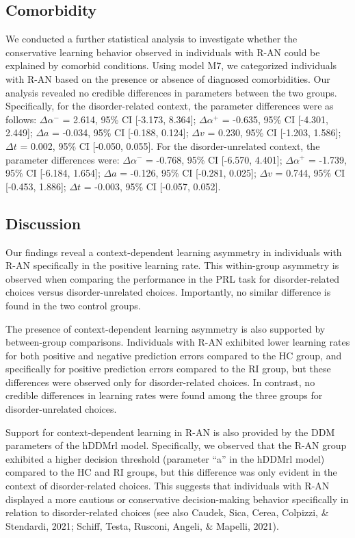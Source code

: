 \documentclass[
  man,floatsintext]{apa6}
\begin{document}
\hypertarget{comorbidity}{%
\subsection{Comorbidity}\label{comorbidity}}

We conducted a further statistical analysis to investigate whether the conservative learning behavior observed in individuals with R-AN could be explained by comorbid conditions. Using model M7, we categorized individuals with R-AN based on the presence or absence of diagnosed comorbidities. Our analysis revealed no credible differences in parameters between the two groups. Specifically, for the disorder-related context, the parameter differences were as follows: \(\Delta \alpha^-\) = 2.614, 95\% CI {[}-3.173, 8.364{]}; \(\Delta \alpha^+\) = -0.635, 95\% CI {[}-4.301, 2.449{]}; \(\Delta a\) = -0.034, 95\% CI {[}-0.188, 0.124{]}; \(\Delta v\) = 0.230, 95\% CI {[}-1.203, 1.586{]}; \(\Delta t\) = 0.002, 95\% CI {[}-0.050, 0.055{]}. For the disorder-unrelated context, the parameter differences were: \(\Delta \alpha^-\) = -0.768, 95\% CI {[}-6.570, 4.401{]}; \(\Delta \alpha^+\) = -1.739, 95\% CI {[}-6.184, 1.654{]}; \(\Delta a\) = -0.126, 95\% CI {[}-0.281, 0.025{]}; \(\Delta v\) = 0.744, 95\% CI {[}-0.453, 1.886{]}; \(\Delta t\) = -0.003, 95\% CI {[}-0.057, 0.052{]}.

\hypertarget{discussion}{%
\subsection{Discussion}\label{discussion}}

Our findings reveal a context-dependent learning asymmetry in individuals with R-AN specifically in the positive learning rate. This within-group asymmetry is observed when comparing the performance in the PRL task for disorder-related choices versus disorder-unrelated choices. Importantly, no similar difference is found in the two control groups.

The presence of context-dependent learning asymmetry is also supported by between-group comparisons. Individuals with R-AN exhibited lower learning rates for both positive and negative prediction errors compared to the HC group, and specifically for positive prediction errors compared to the RI group, but these differences were observed only for disorder-related choices. In contrast, no credible differences in learning rates were found among the three groups for disorder-unrelated choices.

Support for context-dependent learning in R-AN is also provided by the DDM parameters of the hDDMrl model. Specifically, we observed that the R-AN group exhibited a higher decision threshold (parameter ``a'' in the hDDMrl model) compared to the HC and RI groups, but this difference was only evident in the context of disorder-related choices. This suggests that individuals with R-AN displayed a more cautious or conservative decision-making behavior specifically in relation to disorder-related choices (see also Caudek, Sica, Cerea, Colpizzi, \& Stendardi, 2021; Schiff, Testa, Rusconi, Angeli, \& Mapelli, 2021).
\end{document}
